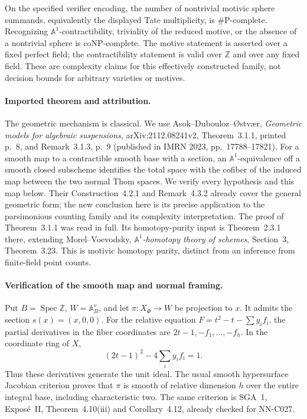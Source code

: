 On the specified verifier encoding, the number of nontrivial motivic
sphere summands, equivalently the displayed Tate multiplicity, is
\#P-complete. Recognizing $\mathbb A^1$-contractibility, triviality of the
reduced motive, or the absence of a nontrivial sphere is coNP-complete.
The motive statement is asserted over a fixed perfect field; the
contractibility statement is valid over $\mathbb Z$ and over any fixed
field. These are complexity claims for this effectively constructed
family, not decision bounds for arbitrary varieties or motives.

\paragraph{Imported theorem and attribution.}
The geometric mechanism is classical. We use Asok--Dubouloz--\O stv\ae r,
\emph{Geometric models for algebraic suspensions}, arXiv:2112.08241v2,
Theorem~3.1.1, printed p.~8, and Remark~3.1.3, p.~9
(published in IMRN 2023, pp.~17788--17821).
For a smooth map to a contractible smooth base with a section, an
$\mathbb A^1$-equivalence off a smooth closed subscheme identifies the
total space with the cofiber of the induced map between the two normal
Thom spaces. We verify every hypothesis and this map below. Their
Construction~4.2.1 and Remark~4.3.2 already cover the general geometric
form; the new conclusion here is its precise application to the
parsimonious counting family and its complexity interpretation.
The proof of Theorem~3.1.1 was read in full. Its homotopy-purity input
is Theorem~2.3.1 there, extending Morel--Voevodsky,
\emph{$\mathbb A^1$-homotopy theory of schemes}, Section~3,
Theorem~3.23. This is motivic homotopy purity, distinct from an
inference from finite-field point counts.

\paragraph{Verification of the smooth map and normal framing.}
Put $B=\operatorname{Spec}\mathbb Z$, $W=\mathbb A^v_B$, and let
$\pi:X_\Phi\to W$ be projection to $x$. It admits the section
$s(x)=(x,0,0)$. For the relative equation
$F=t^2-t-\sum y_i f_i$, the partial derivatives in the fiber
coordinates are $2t-1,-f_1,\ldots,-f_h$. In the coordinate ring of $X$,
\[
                   (2t-1)^2-4\sum_i y_i f_i=1.
\]
Thus these derivatives generate the unit ideal. The usual smooth
hypersurface Jacobian criterion proves that $\pi$ is smooth of relative
dimension $h$ over the entire integral base, including characteristic
two. The same criterion is SGA~1, Expos\'e~II, Theorem~4.10(iii) and
Corollary~4.12, already checked for NN-C027.

